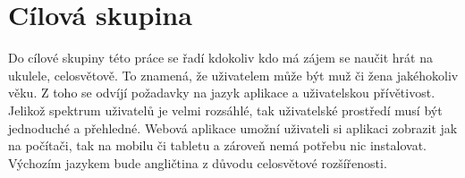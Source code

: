 \section{Cílová skupina}
\label{sc:target_audience}
Do cílové skupiny této práce se řadí kdokoliv kdo má zájem se naučit hrát na ukulele, celosvětově. To znamená, že uživatelem může být muž či žena jakéhokoliv věku. Z toho se odvíjí požadavky na jazyk aplikace a uživatelskou přívětivost. Jelikož spektrum uživatelů je velmi rozsáhlé, tak uživatelské prostředí musí být jednoduché a přehledné. Webová aplikace umožní uživateli si aplikaci zobrazit jak na počítači, tak na mobilu či tabletu a zároveň nemá potřebu nic instalovat. Výchozím jazykem bude angličtina z důvodu celosvětové rozšířenosti.
